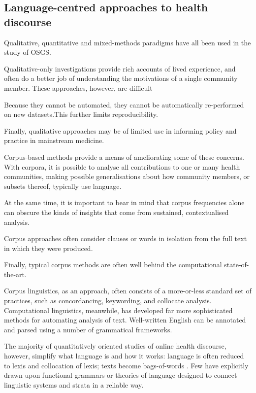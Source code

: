 \documentclass{article}
\renewcommand{\cite}{\parencite}
\begin{document}
\subsection{Language-centred approaches to health discourse}

Qualitative, quantitative and mixed-methods paradigms have all been used in the study of OSGS.

Qualitative-only investigations provide rich accounts of lived experience, and often do a better job of understanding the motivations of a single community member. These approaches, however, are difficult

Because they cannot be automated, they cannot be automatically re-performed on new datasets.This further limits reproducibility.

Finally, qualitative approaches may be of limited use in informing policy and practice in mainstream medicine.

Corpus-based methods provide a means of ameliorating some of these concerns. With corpora, it is possible to analyse all contributions to one or many health communities, making possible generalisations about how community members, or subsets thereof, typically use language.

At the same time, it is important to bear in mind that corpus frequencies alone can obscure the kinds of insights that come from sustained, contextualised analysis.

Corpus approaches often consider clauses or words in isolation from the full text in which they were produced.

Finally, typical corpus methods are often well behind the computational state-of-the-art.


Corpus linguistics, as an approach, often consists of a more-or-less standard set of practices, such as concordancing, keywording, and collocate analysis. Computational linguistics, meanwhile, has developed far more sophisticated methods for automating analysis of text. Well-written English can be annotated and parsed using a number of grammatical frameworks.

The majority of quantitatively oriented studies of online health discourse, however, simplify what language is and how it works: language is often reduced to lexis and collocation of lexis; texts become bags-of-words \cite[e.g.][]{maclean_forum77:_2015,yesha_method_2015}. Few have explicitly drawn upon functional grammars or theories of language designed to connect linguistic systems and strata in a reliable way.
\end{document}
